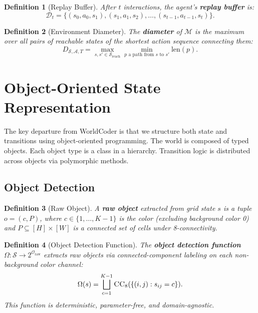 \documentclass{article}
\newtheorem{definition}{Definition}
\newcommand{\calS}{\mathcal{S}}
\newcommand{\calA}{\mathcal{A}}
\newcommand{\calO}{\mathcal{O}}
\newcommand{\calD}{\mathcal{D}}
\newcommand{\calM}{\mathcal{M}}
\begin{document}
\begin{definition}[Replay Buffer]
\label{def:replay}
After $t$ interactions, the agent's \textbf{replay buffer} is:
\begin{equation}
\calD_t = \{(s_0, a_0, s_1), (s_1, a_1, s_2), \ldots, (s_{t-1}, a_{t-1}, s_t)\}.
\end{equation}
\end{definition}

\begin{definition}[Environment Diameter]
\label{def:diameter}
The \textbf{diameter} of $\calM$ is the maximum over all pairs of reachable
states of the shortest action sequence connecting them:
\begin{equation}
D_{\calS,\calA,T} = \max_{s, s' \in \calS_{\text{reach}}}
    \min_{p \text{ a path from } s \text{ to } s'} \text{len}(p).
\end{equation}
\end{definition}



\section{Object-Oriented State Representation}
\label{sec:oop_state}

The key departure from WorldCoder is that we structure both state and
transitions using object-oriented programming.  The world is composed of
typed objects.  Each object type is a class in a hierarchy.  Transition
logic is distributed across objects via polymorphic methods.

\subsection{Object Detection}
\label{sec:detection}

\begin{definition}[Raw Object]
\label{def:raw_object}
A \textbf{raw object} extracted from grid state $s$ is a tuple $o = (c, P)$,
where $c \in \{1, \ldots, K{-}1\}$ is the color (excluding background color 0)
and $P \subseteq [H] \times [W]$ is a connected set of cells under
8-connectivity.
\end{definition}

\begin{definition}[Object Detection Function]
\label{def:detection}
The \textbf{object detection function} $\Omega : \calS \to 2^{\calO_{\text{raw}}}$
extracts raw objects via connected-component labeling on each non-background
color channel:
\begin{equation}
\Omega(s) = \bigsqcup_{c=1}^{K-1} \textsc{CC}_8(\{(i,j) : s_{ij} = c\}).
\end{equation}
This function is deterministic, parameter-free, and domain-agnostic.
\end{definition}
\end{document}
